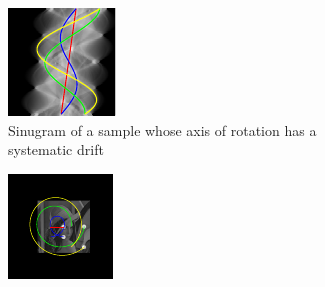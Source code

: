 \begin{figure}
  \centering
  \hfill
  \begin{subfigure}[t]{0.3\textwidth}
    \includegraphics[width=\textwidth]{Chapters/flopt/Figs/PDF/results/helix/sinugram_stretch}
    \caption{Sinugram of a sample whose axis of rotation has a systematic drift}
    \label{fig:flopt_helix_sinugram}
  \end{subfigure}\hfill
  \begin{subfigure}[t]{0.3\textwidth}
    \includegraphics[width=\textwidth]{Chapters/flopt/Figs/PDF/results/helix/topdown_bead_paths}

\end{subfigure}
\end{figure}
